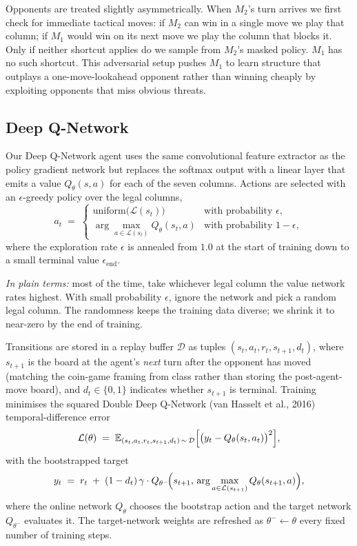 \documentclass[11pt]{article}
\begin{document}
Opponents are treated slightly asymmetrically. When $M_2$'s turn arrives we
first check for immediate tactical moves: if $M_2$ can win in a single move
we play that column; if $M_1$ would win on its next move we play the column
that blocks it. Only if neither shortcut applies do we sample from $M_2$'s
masked policy. $M_1$ has no such shortcut. This adversarial setup pushes
$M_1$ to learn structure that outplays a one-move-lookahead opponent rather
than winning cheaply by exploiting opponents that miss obvious threats.

\subsection{Deep Q-Network}
\label{ssec:dqn}

Our Deep Q-Network agent uses the same convolutional feature extractor as the
policy gradient network but replaces the softmax output with a linear layer
that emits a value $Q_\theta(s, a)$ for each of the seven columns. Actions
are selected with an $\epsilon$-greedy policy over the legal columns,
\[
    a_t \;=\;
    \begin{cases}
        \text{uniform}\bigl(\mathcal{L}(s_t)\bigr) & \text{with probability } \epsilon, \\[0.2em]
        \displaystyle \arg\max_{a \in \mathcal{L}(s_t)} Q_\theta(s_t, a) & \text{with probability } 1 - \epsilon,
    \end{cases}
\]
where the exploration rate $\epsilon$ is annealed from $1.0$ at the start of
training down to a small terminal value $\epsilon_\text{end}$.

\textit{In plain terms:} most of the time, take whichever legal
column the value network rates highest. With small probability
$\epsilon$, ignore the network and pick a random legal column. The
randomness keeps the training data diverse; we shrink it to near-zero
by the end of training.

Transitions are stored in a replay buffer $\mathcal{D}$ as tuples
$(s_t, a_t, r_t, s_{t+1}, d_t)$, where $s_{t+1}$ is the board at the agent's
\emph{next} turn after the opponent has moved (matching the coin-game
framing from class rather than storing the post-agent-move board), and
$d_t \in \{0, 1\}$ indicates whether $s_{t+1}$ is terminal. Training
minimises the squared Double Deep Q-Network (van Hasselt et al., 2016)
temporal-difference error
\[
    \mathcal{L}(\theta)
    \;=\;
    \mathbb{E}_{(s_t, a_t, r_t, s_{t+1}, d_t) \,\sim\, \mathcal{D}}
    \Bigl[\bigl(y_t - Q_\theta(s_t, a_t)\bigr)^{2}\Bigr],
\]
with the bootstrapped target
\[
    y_t
    \;=\;
    r_t
    \;+\;
    (1 - d_t)\, \gamma \cdot
    Q_{\theta^{-}}\!\Bigl(
        s_{t+1},\,
        \arg\max_{a \in \mathcal{L}(s_{t+1})} Q_\theta(s_{t+1}, a)
    \Bigr),
\]
where the online network $Q_\theta$ chooses the bootstrap action and the
target network $Q_{\theta^{-}}$ evaluates it. The target-network weights are
refreshed as $\theta^{-} \leftarrow \theta$ every fixed number of training
steps.
\end{document}
